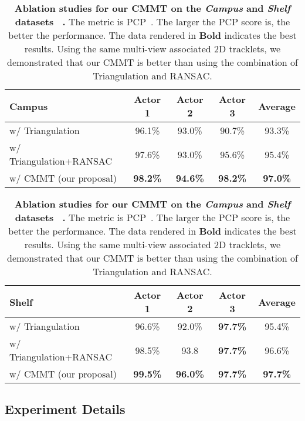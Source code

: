 \documentclass{CVM}
\begin{document}
\begin{table}[h!]
  \setlength{\tabcolsep}{.8pt}
\caption{\textbf{Ablation studies for our CMMT on the \textit{Campus} and 
  \textit{Shelf} datasets~\cite{fleuret2007multicamera,BelagiannisAASN16} .} The metric is PCP~\cite{fleuret2007multicamera,BelagiannisAASN16}. The larger the PCP score is, the better the performance. The data rendered in \textbf{Bold} indicates the best results. Using the same multi-view associated 2D tracklets, we demonstrated that our CMMT is better than using the combination of Triangulation and RANSAC.}\label{tab:ablation_campus_shelf}
 
  \begin{minipage}{\linewidth}
  \centering
  \begin{tabular}{lcccc}
  \midrule
  Campus & Actor 1 & Actor 2 &Actor 3 &Average    \\ \midrule
  w/ Triangulation & 96.1\%  & 93.0\% & 90.7\% & 93.3\% \\ 
  w/ Triangulation+RANSAC & 97.6\% & 93.0\% & 95.6\% & 95.4\% \\ 
  w/ CMMT (our proposal) & \textbf{98.2\%} &  \textbf{94.6\%}  & \textbf{98.2\%} &  \textbf{97.0\%}   \\ 
  \bottomrule
  \end{tabular}
  \end{minipage}

\begin{minipage}{\linewidth}
  \centering
  \begin{tabular}{lcccc}
  \midrule
  Shelf & Actor 1 & Actor 2 &Actor 3 &Average    \\ \midrule
  w/ Triangulation & 96.6\% & 92.0\%  & \textbf{97.7\%} & 95.4\% \\ 
  w/ Triangulation+RANSAC & 98.5\% & 93.8& \textbf{97.7\%} & 96.6\% \\ 
  w/ CMMT (our proposal)   & \textbf{99.5\%} &  \textbf{96.0\%}  & \textbf{97.7\%} &  \textbf{97.7\%}   \\ 
  \bottomrule
  \end{tabular}
\end{minipage}
\end{table}








\subsection{Experiment Details}
\end{document}

